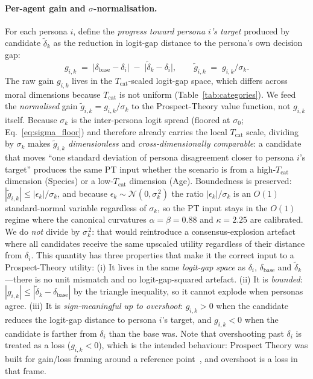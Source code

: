\documentclass{article}
\begin{document}
\paragraph{Per-agent gain and $\sigma$-normalisation.}
For each persona $i$, define the \emph{progress toward persona $i$'s target}
produced by candidate $\tilde{\delta}_k$ as the reduction in logit-gap distance
to the persona's own decision gap:
\begin{equation}
  g_{i,k} \;=\; \bigl|\delta_{\text{base}} - \delta_i\bigr|
              \;-\; \bigl|\tilde{\delta}_k - \delta_i\bigr|,
  \qquad
  \tilde{g}_{i,k} \;=\; g_{i,k}\big/\sigma_k.
  \label{eq:agreement}
\end{equation}
The raw gain $g_{i,k}$ lives in the $T_{\text{cat}}$-scaled logit-gap space,
which differs across moral dimensions because $T_{\text{cat}}$ is not
uniform (Table~\ref{tab:categories}). We feed the \emph{normalised} gain
$\tilde{g}_{i,k} = g_{i,k}/\sigma_k$ to the Prospect-Theory value function,
not $g_{i,k}$ itself. Because $\sigma_k$ is the inter-persona logit spread
(floored at $\sigma_0$; Eq.~\ref{eq:sigma_floor}) and therefore already
carries the local $T_{\text{cat}}$ scale, dividing by $\sigma_k$ makes
$\tilde{g}_{i,k}$ \emph{dimensionless} and \emph{cross-dimensionally
comparable}: a candidate that moves ``one standard deviation of persona
disagreement closer to persona $i$'s target'' produces the same PT input
whether the scenario is from a high-$T_{\text{cat}}$ dimension (Species)
or a low-$T_{\text{cat}}$ dimension (Age). Boundedness is preserved:
$|\tilde{g}_{i,k}|\le|\epsilon_k|/\sigma_k$, and because $\epsilon_k\sim
\mathcal{N}(0,\sigma_k^{\,2})$ the ratio $|\epsilon_k|/\sigma_k$ is an
$O(1)$ standard-normal variable regardless of $\sigma_k$, so the PT input
stays in the $O(1)$ regime where the canonical curvatures
$\alpha{=}\beta{=}0.88$ and $\kappa{=}2.25$ are calibrated.
We do \emph{not} divide by $\sigma_k^{\,2}$: that would reintroduce a
consensus-explosion artefact where all candidates receive the same
upscaled utility regardless of their distance from $\delta_i$.
This quantity has three properties that make it the correct input to a
Prospect-Theory utility:
(i) It lives in the same \emph{logit-gap space} as $\delta_i$, $\delta_{\text{base}}$
and $\tilde{\delta}_k$---there is no unit mismatch and no logit-gap-squared
artefact.
(ii) It is \emph{bounded}: $|g_{i,k}|\le|\tilde{\delta}_k - \delta_{\text{base}}|$
by the triangle inequality, so it cannot explode when personas agree.
(iii) It is \emph{sign-meaningful up to overshoot}: $g_{i,k}>0$ when the
candidate reduces the logit-gap distance to persona $i$'s target, and
$g_{i,k}<0$ when the candidate is farther from $\delta_i$ than the base was.
Note that overshooting past $\delta_i$ is treated as a loss ($g_{i,k}<0$),
which is the intended behaviour: Prospect Theory was built for gain/loss
framing around a reference point~\citep{kahneman1979prospect}, and overshoot
is a loss in that frame.
\end{document}

